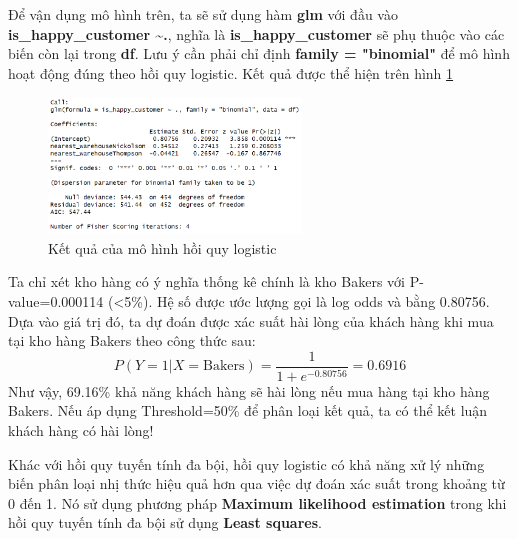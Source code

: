 Để vận dụng mô hình trên, ta sẽ sử dụng hàm \textbf{glm} với đầu vào \textbf{is\_happy\_customer \textasciitilde .}, nghĩa là \textbf{is\_happy\_customer} sẽ phụ thuộc vào các biến còn lại trong \textbf{df}. Lưu ý cần phải chỉ định \textbf{family = "binomial"} để mô hình hoạt động đúng theo hồi quy logistic. Kết quả được thể hiện trên hình \ref{fig:logistic}
\begin{figure}[!htbp]
    \centering
    \includegraphics[width=0.6\textwidth]{graphics/mo_rong/f2.PNG}
    \caption{Kết quả của mô hình hồi quy logistic}
    \label{fig:logistic}
\end{figure}

Ta chỉ xét kho hàng có ý nghĩa thống kê chính là kho Bakers với P-value=0.000114 (<5\%). Hệ số được ước lượng gọi là log odds và bằng 0.80756. Dựa vào giá trị đó, ta dự đoán được xác suất hài lòng của khách hàng khi mua tại kho hàng Bakers theo công thức sau:
\[
    P(Y=1|X=\text{Bakers}) = \frac{1}{1 + e^{-0.80756}} = 0.6916
\]
Như vậy, 69.16\% khả năng khách hàng sẽ hài lòng nếu mua hàng tại kho hàng Bakers. Nếu áp dụng Threshold=50\% để phân loại kết quả, ta có thể kết luận khách hàng có hài lòng!

Khác với hồi quy tuyến tính đa bội, hồi quy logistic có khả năng xử lý những biến phân loại nhị thức hiệu quả hơn qua việc dự đoán xác suất trong khoảng từ 0 đến 1. Nó sử dụng phương pháp \textbf{Maximum likelihood estimation} trong khi hồi quy tuyến tính đa bội sử dụng \textbf{Least squares}.